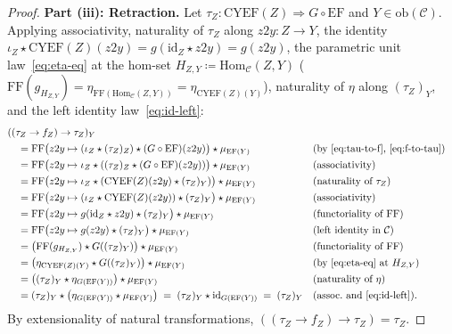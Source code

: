 \documentclass[11pt,a4paper]{article}
\theoremstyle{definition}
\theoremstyle{remark}
\newcommand{\Hom}{\mathrm{Hom}}
\newcommand{\id}{\mathrm{id}}
\newcommand{\CYEF}{\mathrm{CYEF}}
\newcommand{\FF}{\mathrm{FF}}
\newcommand{\EF}{\mathrm{EF}}
\newcommand{\iotaZ}{\iota_Z}
\begin{document}
\begin{proof}
\textbf{Part (iii): Retraction.}
Let $\tau_Z : \CYEF(Z) \Rightarrow G \circ \EF$ and $Y \in \mathrm{ob}(\mathcal{C})$. Applying
associativity, naturality of $\tau_Z$ along $z2y : Z \to Y$, the identity
$\iotaZ \star \CYEF(Z)(z2y) = g(\id_Z \star z2y) = g(z2y)$, the parametric unit
law~\eqref{eq:eta-eq} at the hom-set $H_{Z,Y} \coloneqq \Hom_{\mathcal{C}}(Z, Y)$
($\FF(g_{H_{Z,Y}}) = \eta_{\FF(\Hom_{\mathcal{C}}(Z, Y))} = \eta_{\CYEF(Z)(Y)}$), naturality of $\eta$
along $(\tau_Z)_Y$, and the left identity law~\eqref{eq:id-left}:
\begin{align*}
  &((\tau_Z \to f_Z) \to \tau_Z)_Y \\
  &\quad= \FF\bigl(z2y \mapsto (\iotaZ \star (\tau_Z)_Z) \star (G\circ\EF)(z2y)\bigr) \star \mu_{\EF(Y)}
    &&\text{(by \eqref{eq:tau-to-f}, \eqref{eq:f-to-tau})} \\
  &\quad= \FF\bigl(z2y \mapsto \iotaZ \star ((\tau_Z)_Z \star (G\circ\EF)(z2y))\bigr) \star \mu_{\EF(Y)}
    &&\text{(associativity)} \\
  &\quad= \FF\bigl(z2y \mapsto \iotaZ \star (\CYEF(Z)(z2y) \star (\tau_Z)_Y)\bigr) \star \mu_{\EF(Y)}
    &&\text{(naturality of $\tau_Z$)} \\
  &\quad= \FF\bigl(z2y \mapsto (\iotaZ \star \CYEF(Z)(z2y)) \star (\tau_Z)_Y\bigr) \star \mu_{\EF(Y)}
    &&\text{(associativity)} \\
  &\quad= \FF\bigl(z2y \mapsto g(\id_Z \star z2y) \star (\tau_Z)_Y\bigr) \star \mu_{\EF(Y)}
    &&\text{(functoriality of $\FF$)} \\
  &\quad= \FF\bigl(z2y \mapsto g(z2y) \star (\tau_Z)_Y\bigr) \star \mu_{\EF(Y)}
    &&\text{(left identity in $\mathcal{C}$)} \\
  &\quad= \bigl(\FF(g_{H_{Z,Y}}) \star G((\tau_Z)_Y)\bigr) \star \mu_{\EF(Y)}
    &&\text{(functoriality of $\FF$)} \\
  &\quad= \bigl(\eta_{\CYEF(Z)(Y)} \star G((\tau_Z)_Y)\bigr) \star \mu_{\EF(Y)}
    &&\text{(by \eqref{eq:eta-eq} at $H_{Z,Y}$)} \\
  &\quad= \bigl((\tau_Z)_Y \star \eta_{G(\EF(Y))}\bigr) \star \mu_{\EF(Y)}
    &&\text{(naturality of $\eta$)} \\
  &\quad= (\tau_Z)_Y \star \bigl(\eta_{G(\EF(Y))} \star \mu_{\EF(Y)}\bigr)
   \;=\; (\tau_Z)_Y \star \id_{G(\EF(Y))} \;=\; (\tau_Z)_Y
    &&\text{(assoc.\ and \eqref{eq:id-left})}.
\end{align*}
By extensionality of natural transformations, $((\tau_Z \to f_Z) \to \tau_Z) = \tau_Z$.
\end{proof}
\end{document}
